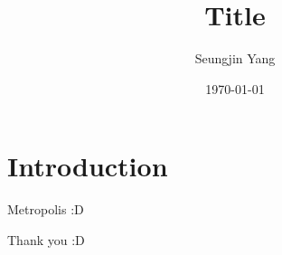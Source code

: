\documentclass[10pt]{beamer}
\title{Title}
\date{\today}
\author{Seungjin Yang}
\begin{document}
\maketitle


\section[Introduction]{Introduction}

\begin{frame}[fragile]{Metropolis}
    :D
\end{frame}

\begin{frame}[standout]
  Thank you :D
\end{frame}
\end{document}
